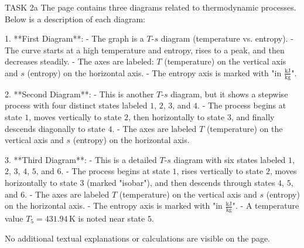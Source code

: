 TASK 2a  
The page contains three diagrams related to thermodynamic processes. Below is a description of each diagram:

1. **First Diagram**:  
   - The graph is a \( T \)-\( s \) diagram (temperature vs. entropy).  
   - The curve starts at a high temperature and entropy, rises to a peak, and then decreases steadily.  
   - The axes are labeled: \( T \) (temperature) on the vertical axis and \( s \) (entropy) on the horizontal axis.  
   - The entropy axis is marked with "in \( \frac{\text{kJ}}{\text{kg}} \)".

2. **Second Diagram**:  
   - This is another \( T \)-\( s \) diagram, but it shows a stepwise process with four distinct states labeled \( 1 \), \( 2 \), \( 3 \), and \( 4 \).  
   - The process begins at state \( 1 \), moves vertically to state \( 2 \), then horizontally to state \( 3 \), and finally descends diagonally to state \( 4 \).  
   - The axes are labeled \( T \) (temperature) on the vertical axis and \( s \) (entropy) on the horizontal axis.

3. **Third Diagram**:  
   - This is a detailed \( T \)-\( s \) diagram with six states labeled \( 1 \), \( 2 \), \( 3 \), \( 4 \), \( 5 \), and \( 6 \).  
   - The process begins at state \( 1 \), rises vertically to state \( 2 \), moves horizontally to state \( 3 \) (marked "isobar"), and then descends through states \( 4 \), \( 5 \), and \( 6 \).  
   - The axes are labeled \( T \) (temperature) on the vertical axis and \( s \) (entropy) on the horizontal axis.  
   - The entropy axis is marked with "in \( \frac{\text{kJ}}{\text{kg}} \)".  
   - A temperature value \( T_5 = 431.94 \, \text{K} \) is noted near state \( 5 \).

No additional textual explanations or calculations are visible on the page.